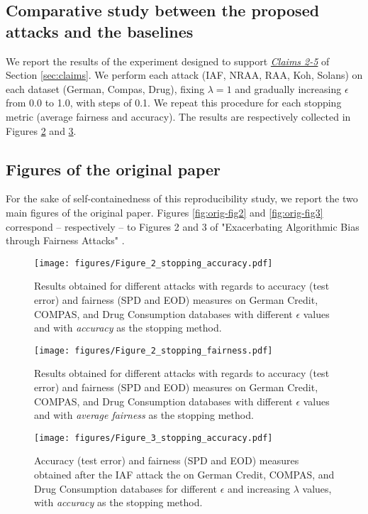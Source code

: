 \subsection{Comparative study between the proposed attacks and the baselines}\label{app:comparative}
We report the results of the experiment designed to support \hyperlink{claim-2}{\textit{Claims 2-5}} of Section \ref{sec:claims}. We perform each attack (IAF, NRAA, RAA, Koh, Solans) on each dataset (German, Compas, Drug), fixing $\lambda = 1$ and gradually increasing $\epsilon$ from 0.0 to 1.0, with steps of 0.1. We repeat this procedure for each stopping metric (average fairness and accuracy). The results are respectively collected in Figures \ref{fig:2-stop-fairness} and \ref{fig:3-stop-accuracy}.

\subsection{Figures of the original paper}\label{app:orig-figs}
For the sake of self-containedness of this reproducibility study, we report the two main figures of the original paper. Figures \ref{fig:orig-fig2} and \ref{fig:orig-fig3} correspond -- respectively -- to Figures 2 and 3 of "Exacerbating Algorithmic Bias through Fairness Attacks" \citep{originalpaper}.
\clearpage

\begin{figure}
    \centering
    \texttt{[image: figures/Figure\_2\_stopping\_accuracy.pdf]}
    \caption{Results obtained for different attacks with regards to accuracy (test error) and fairness (SPD and EOD) measures on German Credit, COMPAS, and Drug Consumption databases with different $\epsilon$ values and with \textit{accuracy} as the stopping method.}
    \label{fig:2-stop-accuracy}
\end{figure}

\begin{figure}
    \centering
    \texttt{[image: figures/Figure\_2\_stopping\_fairness.pdf]}
    \caption{Results obtained for different attacks with regards to accuracy (test error) and fairness (SPD and EOD) measures on German Credit, COMPAS, and Drug Consumption databases with different $\epsilon$ values and with \textit{average fairness} as the stopping method.}
    \label{fig:2-stop-fairness}
\end{figure}

\begin{figure}
    \centering
    \texttt{[image: figures/Figure\_3\_stopping\_accuracy.pdf]}
    \caption{Accuracy (test error) and fairness (SPD and EOD) measures obtained after the IAF attack the on German Credit, COMPAS, and Drug Consumption databases for different $\epsilon$ and increasing $\lambda$ values,  with \textit{accuracy} as the stopping method.}
    \label{fig:3-stop-accuracy}
\end{figure}


